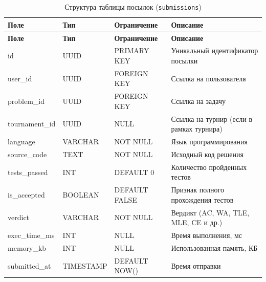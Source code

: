 \begin{longtable}{|l|l|p{3.5cm}|p{5.5cm}|}
	\caption{Структура таблицы посылок (\texttt{submissions})} \label{tab:db_submissions} \\

	\hline
	\textbf{Поле}    & \textbf{Тип} & \textbf{Ограничение} & \textbf{Описание}                        \\ \hline
	\endfirsthead

	\tabcont{\ref{tab:db_submissions}}
	\textbf{Поле}    & \textbf{Тип} & \textbf{Ограничение} & \textbf{Описание}                        \\ \hline
	\endhead

	\hline
	\endfoot

	\hline
	\endlastfoot

	id               & UUID         & PRIMARY KEY          & Уникальный идентификатор посылки         \\ \hline
	user\_id         & UUID         & FOREIGN KEY          & Ссылка на пользователя                   \\ \hline
	problem\_id      & UUID         & FOREIGN KEY          & Ссылка на задачу                         \\ \hline
	tournament\_id   & UUID         & NULL                 & Ссылка на турнир (если в рамках турнира) \\ \hline
	language         & VARCHAR      & NOT NULL             & Язык программирования                    \\ \hline
	source\_code     & TEXT         & NOT NULL             & Исходный код решения                     \\ \hline
	tests\_passed    & INT          & DEFAULT 0            & Количество пройденных тестов             \\ \hline
	is\_accepted     & BOOLEAN      & DEFAULT FALSE        & Признак полного прохождения тестов       \\ \hline
	verdict          & VARCHAR      & NOT NULL             & Вердикт (AC, WA, TLE, MLE, CE и др.)    \\ \hline
	exec\_time\_ms   & INT          & NULL                 & Время выполнения, мс                     \\ \hline
	memory\_kb       & INT          & NULL                 & Использованная память, КБ                \\ \hline
	submitted\_at    & TIMESTAMP    & DEFAULT NOW()        & Время отправки                           \\ \hline
\end{longtable}

